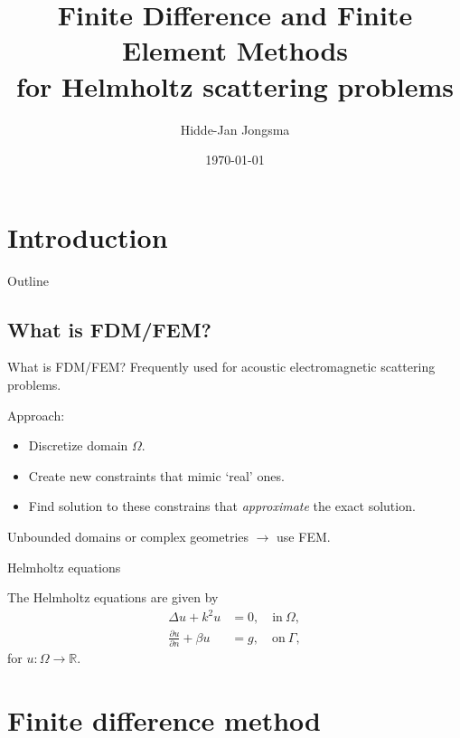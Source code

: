 \documentclass[]{beamer}
\title{Finite Difference and Finite Element Methods \\ for Helmholtz scattering problems}
\author{ Hidde-Jan Jongsma }
\institute{ RuG }
\date{\today}
\newcommand{\Reals}{\mathbb{R}}
\begin{document}

\maketitle

\section{Introduction}

\begin{frame}{Outline}
    \small \tableofcontents
\end{frame}

\subsection{What is FDM/FEM?}

\begin{frame}{What is FDM/FEM?}
  Frequently used for acoustic electromagnetic scattering problems.

  Approach:
    \begin{itemize}
        \item Discretize domain $\Omega$.
        \item Create new constraints that mimic `real' ones.
        \item Find solution to these constrains that \emph{approximate} the exact solution.
    \end{itemize}
  
  Unbounded domains or complex geometries $\rightarrow$ use FEM.
\end{frame}

\begin{frame}{Helmholtz equations}
    \begin{definition}
      The Helmholtz equations are given by
\begin{align}
  \Delta u + k^2 u & = 0, \quad \text{in}\ \Omega, \label{eq:Duku} \\
  \frac{\partial u}{\partial n} + \beta u & = g, \quad \text{on}\ \Gamma, \label{eq:2Dbc}
\end{align}
      for $u : \Omega \rightarrow \Reals$.
    \end{definition}
    
\end{frame}

\section{Finite difference method}
\end{document}

